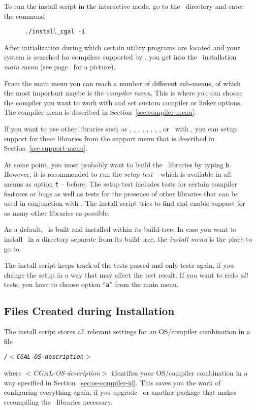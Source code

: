 To run the install script in the interactive mode, go to the \cgaldir\
directory and enter the command
\begin{verbatim}
      ./install_cgal -i
\end{verbatim}

After initialization during which certain utility programs are located
and your system is searched for compilers supported by \cgal, you get
into the \cgal\ installation \textit{main menu} (see
page~\pageref{pic:main-menu} for a picture).

From the main menu you can reach a number of different sub-menus, of
which the most important maybe is the \textit{compiler menu}. This is
where you can choose the compiler you want to work with and set custom
compiler or linker options. The compiler menu is described in
Section~\ref{sec:compiler-menu}.

If you want to use other libraries such as \boost, \gmp, \mpfr, \core,
\blas, \lapack, \taucs, \leda, or \qt\ with \cgal, you can setup
support for these libraries from the support menu that is described in
Section~\ref{sec:support-menu}.

At some point, you most probably want to build the \cgal\ libraries by
typing \texttt{b}. However, it is recommended to run the \textit{setup
  test} -- which is available in all menus as option \texttt{t} --
before. The setup test includes tests for certain compiler features or
bugs as well as tests for the presence of other libraries that can be
used in conjunction with \cgal. The install script tries to find and
enable support for as many other libraries as possible.

As a default, \cgal\ is built and installed within its build-tree. In
case you want to install \cgal\ in a directory separate from its
build-tree, the \textit{install menu} is the place to go to.

The install script keeps track of the tests passed and only tests
again, if you change the setup in a way that may affect the test
result. If you want to redo \textit{all} tests, you have to choose
option ``\texttt{a}'' from the main menu.

\subsection{Files Created during Installation\label{sec:filescreated}}

The install script stores all relevant settings for an OS/compiler
combination in a file
\begin{center}
  \texttt{\cgalinstconfdir/$<$\textit{CGAL-OS-description}$>$}
\end{center}
where $<$\textit{CGAL-OS-description}$>$ identifies your OS/compiler
combination in a way specified in Section~\ref{sec:os-compiler-id}.
This saves you the work of configuring everything again, if you
upgrade  \cgal\ or
another package that makes recompiling the \cgal\ libraries necessary.

